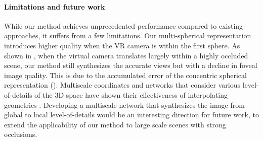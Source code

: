 \paragraph{Limitations and future work}
While our method achieves unprecedented performance compared to existing approaches, it suffers from a few limitations. Our multi-spherical representation introduces higher quality when the VR camera is within the first sphere. As shown in , when the virtual camera translates largely within a highly occluded scene, our method still synthesizes the accurate views but with a decline in foveal image quality. This is due to the accumulated error of the concentric spherical representation ().
Multiscale coordinates and networks that consider various level-of-details of the 3D space have shown their effectiveness of interpolating geometries \cite{winkler2010multi}. Developing a multiscale network that synthesizes the image from global to local level-of-details would be an interesting direction for future work, to extend the applicability of our method to large scale scenes with strong occlusions.
